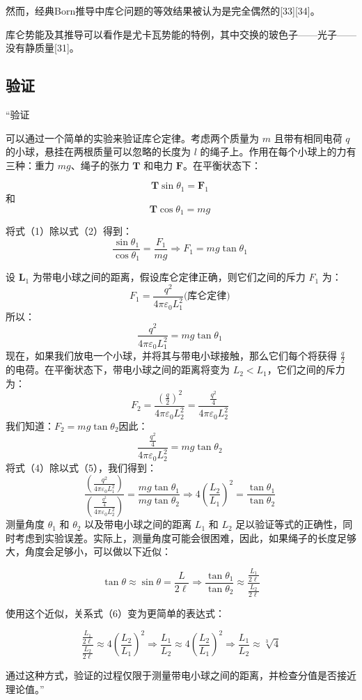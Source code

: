 然而，经典Born推导中库仑问题的等效结果被认为是完全偶然的[33][34]。

库仑势能及其推导可以看作是尤卡瓦势能的特例，其中交换的玻色子——光子——没有静质量[31]。
\subsection{验证}
“验证

可以通过一个简单的实验来验证库仑定律。考虑两个质量为 \( m \) 且带有相同电荷 \( q \) 的小球，悬挂在两根质量可以忽略的长度为 \( l \) 的绳子上。作用在每个小球上的力有三种：重力 \( mg \)、绳子的张力 \( \mathbf{T} \) 和电力 \( \mathbf{F} \)。在平衡状态下：

\[
\mathbf{T} \sin \theta_1 = \mathbf{F}_1 \tag{1}~
\]
和
\[
\mathbf{T} \cos \theta_1 = mg \tag{2}~
\]

将式（1）除以式（2）得到：
\[
\frac{\sin \theta_1}{\cos \theta_1} = \frac{F_1}{mg} \Rightarrow F_1 = mg \tan \theta_1 \tag{3}~
\]

设 \( \mathbf{L}_1 \) 为带电小球之间的距离，假设库仑定律正确，则它们之间的斥力 \( F_1 \) 为：
\[
F_1 = \frac{q^2}{4 \pi \varepsilon_0 L_1^2}\text{(库仑定律)}~ 
\]
所以：
\[
\frac{q^2}{4\pi \varepsilon_0 L_1^2} = mg \tan \theta_1 \tag{4}~
\]
现在，如果我们放电一个小球，并将其与带电小球接触，那么它们每个将获得 \( \frac{q}{2} \) 的电荷。在平衡状态下，带电小球之间的距离将变为 \( L_2 < L_1 \)，它们之间的斥力为：
\[
F_2 = \frac{\left( \frac{q}{2} \right)^2}{4 \pi \varepsilon_0 L_2^2} = \frac{\frac{q^2}{4}}{4 \pi \varepsilon_0 L_2^2} \tag{5}~
\]
我们知道：\(F_2 = mg \tan \theta_2\)因此：
\[
\frac{\frac{q^2}{4}}{4 \pi \varepsilon_0 L_2^2} = mg \tan \theta_2~
\]
将式（4）除以式（5），我们得到：
\[
\frac{\left( \frac{q^2}{4 \pi \varepsilon_0 L_1^2} \right)}{\left( \frac{\frac{q^2}{4}}{4 \pi \varepsilon_0 L_2^2} \right)} = \frac{mg \tan \theta_1}{mg \tan \theta_2} \Rightarrow 4 \left( \frac{L_2}{L_1} \right)^2 = \frac{\tan \theta_1}{\tan \theta_2} \tag{6}~
\] 
测量角度 \( \theta_1 \) 和 \( \theta_2 \) 以及带电小球之间的距离 \( L_1 \) 和 \( L_2 \) 足以验证等式的正确性，同时考虑到实验误差。实际上，测量角度可能会很困难，因此，如果绳子的长度足够大，角度会足够小，可以做以下近似：

\[
\tan \theta \approx \sin \theta = \frac{L}{2\ell} \Rightarrow \frac{\tan \theta_1}{\tan \theta_2} \approx \frac{\frac{L_1}{2\ell}}{\frac{L_2}{2\ell}} \tag{7}
\]

使用这个近似，关系式（6）变为更简单的表达式：

\[
\frac{\frac{L_1}{2\ell}}{\frac{L_2}{2\ell}} \approx 4 \left( \frac{L_2}{L_1} \right)^2 \Rightarrow \frac{L_1}{L_2} \approx 4 \left( \frac{L_2}{L_1} \right)^2 \Rightarrow \frac{L_1}{L_2} \approx \sqrt[3]{4} \tag{8}
\]

通过这种方式，验证的过程仅限于测量带电小球之间的距离，并检查分值是否接近理论值。”